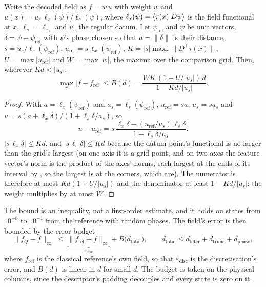 \begin{proposition}
\label{prop:readout-bound}
Write the decoded field as $f=w\,u$ with weight $w$ and $u(x)=u_s\,\ell_x(\psi)/\ell_s(\psi)$, where $\ell_x(\psi)=\braket{\tau(x)|D\psi}$ is the field functional at $x$, $\ell_s=\ell_{x_s}$ and $u_s$ the regular datum. Let $\psi_{\mathrm{ref}}$ and $\psi$ be unit vectors, $\delta=\psi-\psi_{\mathrm{ref}}$ with $\psi$'s phase chosen so that $d=\|\delta\|$ is their distance, $s=u_s/\ell_s(\psi_{\mathrm{ref}})$, $u_{\mathrm{ref}}=s\,\ell_x(\psi_{\mathrm{ref}})$, $K=|s|\max_x\|D^\top\tau(x)\|$, $U=\max|u_{\mathrm{ref}}|$ and $W=\max|w|$, the maxima over the comparison grid. Then, wherever $Kd<|u_s|$,
\begin{equation*}
    \max_x|f-f_{\mathrm{ref}}|\le B(d)=\frac{WK\,(1+U/|u_s|)\,d}{1-Kd/|u_s|}.
\end{equation*}
\end{proposition}
\begin{proof}
With $a=\ell_x(\psi_{\mathrm{ref}})$ and $a_s=\ell_s(\psi_{\mathrm{ref}})$, $u_{\mathrm{ref}}=sa$, $u_s=sa_s$ and $u=s(a+\ell_x\delta)/(1+\ell_s\delta/a_s)$, so
\begin{equation*}
    u-u_{\mathrm{ref}}=s\,\frac{\ell_x\delta-(u_{\mathrm{ref}}/u_s)\,\ell_s\delta}{1+\ell_s\delta/a_s}.
\end{equation*}
$|s\,\ell_x\delta|\le Kd$, and $|s\,\ell_s\delta|\le Kd$ because the datum point's functional is no larger than the grid's largest (on one axis it is a grid point, and on two axes the feature vector's norm is the product of the axes' norms, each largest at the ends of its interval by , so the largest is at the corners, which are). The numerator is therefore at most $Kd(1+U/|u_s|)$ and the denominator at least $1-Kd/|u_s|$; the weight multiplies by at most $W$.
\end{proof}

The bound is an inequality, not a first-order estimate, and it holds on states from $10^{-8}$ to $10^{-1}$ from the reference with random phases. The field's error is then bounded by the error budget
\begin{equation}
    \|f_Q-f\|_\infty\;\le\;\underbrace{\|f_{\mathrm{ref}}-f\|_\infty}_{\varepsilon_{\mathrm{disc}}}+B\bigl(d_{\mathrm{total}}\bigr),
    \qquad
    d_{\mathrm{total}}\le d_{\mathrm{filter}}+d_{\mathrm{trunc}}+d_{\mathrm{phase}} ,
    \label{eq:error-budget}
\end{equation}
where $f_{\mathrm{ref}}$ is the classical reference's own field, so that $\varepsilon_{\mathrm{disc}}$ is the discretisation's error, and $B(d)$ is linear in $d$ for small $d$. The budget is taken on the physical columns, since the descriptor's padding decouples and every state is zero on it.

